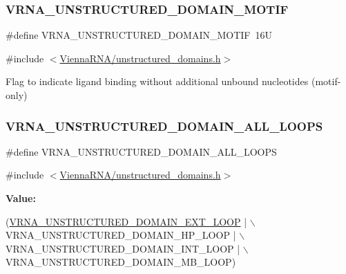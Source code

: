 \subsubsection{\texorpdfstring{V\+R\+N\+A\+\_\+\+U\+N\+S\+T\+R\+U\+C\+T\+U\+R\+E\+D\+\_\+\+D\+O\+M\+A\+I\+N\+\_\+\+M\+O\+T\+IF}{VRNA\_UNSTRUCTURED\_DOMAIN\_MOTIF}}
{\footnotesize\ttfamily \#define V\+R\+N\+A\+\_\+\+U\+N\+S\+T\+R\+U\+C\+T\+U\+R\+E\+D\+\_\+\+D\+O\+M\+A\+I\+N\+\_\+\+M\+O\+T\+IF~16U}



{\ttfamily \#include $<$\mbox{\hyperlink{unstructured__domains_8h}{Vienna\+R\+N\+A/unstructured\+\_\+domains.\+h}}$>$}



Flag to indicate ligand binding without additional unbound nucleotides (motif-\/only) 

\mbox{\label{group__domains__up_ga3c6be4cce70f1af9e885788856101699}} 
\subsubsection{\texorpdfstring{V\+R\+N\+A\+\_\+\+U\+N\+S\+T\+R\+U\+C\+T\+U\+R\+E\+D\+\_\+\+D\+O\+M\+A\+I\+N\+\_\+\+A\+L\+L\+\_\+\+L\+O\+O\+PS}{VRNA\_UNSTRUCTURED\_DOMAIN\_ALL\_LOOPS}}
{\footnotesize\ttfamily \#define V\+R\+N\+A\+\_\+\+U\+N\+S\+T\+R\+U\+C\+T\+U\+R\+E\+D\+\_\+\+D\+O\+M\+A\+I\+N\+\_\+\+A\+L\+L\+\_\+\+L\+O\+O\+PS}



{\ttfamily \#include $<$\mbox{\hyperlink{unstructured__domains_8h}{Vienna\+R\+N\+A/unstructured\+\_\+domains.\+h}}$>$}

{\bfseries Value\+:}
\begin{DoxyCode}
(\mbox{\hyperlink{group__domains__up_gaac911374e86236a51bfd42e1f098eaba}{VRNA\_UNSTRUCTURED\_DOMAIN\_EXT\_LOOP}} | \(\backslash\)
                                              VRNA\_UNSTRUCTURED\_DOMAIN\_HP\_LOOP | \(\backslash\)
                                              VRNA\_UNSTRUCTURED\_DOMAIN\_INT\_LOOP | \(\backslash\)
                                              VRNA\_UNSTRUCTURED\_DOMAIN\_MB\_LOOP)
\end{DoxyCode}


